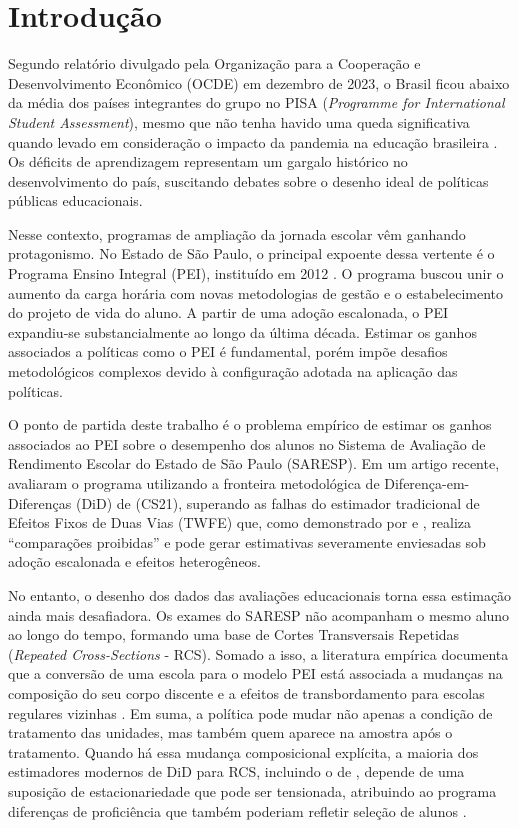 \pagestyle{plain} \label{sec:introduction}

\chapter{Introdução}

Segundo relatório divulgado pela Organização para a Cooperação e Desenvolvimento Econômico (OCDE) em dezembro de 2023, o Brasil ficou abaixo da média dos países integrantes do grupo no PISA (\textit{Programme for International Student Assessment}), mesmo que não tenha havido uma queda significativa quando levado em consideração o impacto da pandemia na educação brasileira \cite{oecd_pisa2022_brazil}. Os déficits de aprendizagem representam um gargalo histórico no desenvolvimento do país, suscitando debates sobre o desenho ideal de políticas públicas educacionais. 

Nesse contexto, programas de ampliação da jornada escolar vêm ganhando protagonismo. No Estado de São Paulo, o principal expoente dessa vertente é o Programa Ensino Integral (PEI), instituído em 2012 \cite{sao_paulo_pei_2012}. O programa buscou unir o aumento da carga horária com novas metodologias de gestão e o estabelecimento do projeto de vida do aluno. A partir de uma adoção escalonada, o PEI expandiu-se substancialmente ao longo da última década. Estimar os ganhos associados a políticas como o PEI é fundamental, porém impõe desafios metodológicos complexos devido à configuração adotada na aplicação das políticas.

O ponto de partida deste trabalho é o problema empírico de estimar os ganhos associados ao PEI sobre o desempenho dos alunos no Sistema de Avaliação de Rendimento Escolar do Estado de São Paulo (SARESP). Em um artigo recente, \textcite{scorzafave2023} avaliaram o programa utilizando a fronteira metodológica de Diferença-em-Diferenças (DiD) de \textcite{callawaysantanna} (CS21), superando as falhas do estimador tradicional de Efeitos Fixos de Duas Vias (TWFE) que, como demonstrado por \textcite{goodmanbacon} e \textcite{chaisemartin2020}, realiza ``comparações proibidas'' e pode gerar estimativas severamente enviesadas sob adoção escalonada e efeitos heterogêneos.

No entanto, o desenho dos dados das avaliações educacionais torna essa estimação ainda mais desafiadora. Os exames do SARESP não acompanham o mesmo aluno ao longo do tempo, formando uma base de Cortes Transversais Repetidas (\textit{Repeated Cross-Sections} - RCS). Somado a isso, a literatura empírica documenta que a conversão de uma escola para o modelo PEI está associada a mudanças na composição do seu corpo discente \cite{favaro_composicao_pei} e a efeitos de transbordamento para escolas regulares vizinhas \cite{santos2022_spillover_pei_escolas_regulares}. Em suma, a política pode mudar não apenas a condição de tratamento das unidades, mas também quem aparece na amostra após o tratamento. Quando há essa mudança composicional explícita, a maioria dos estimadores modernos de DiD para RCS, incluindo o de \textcite{callawaysantanna}, depende de uma suposição de estacionariedade que pode ser tensionada, atribuindo ao programa diferenças de proficiência que também poderiam refletir seleção de alunos \cite{santannaxu}.

